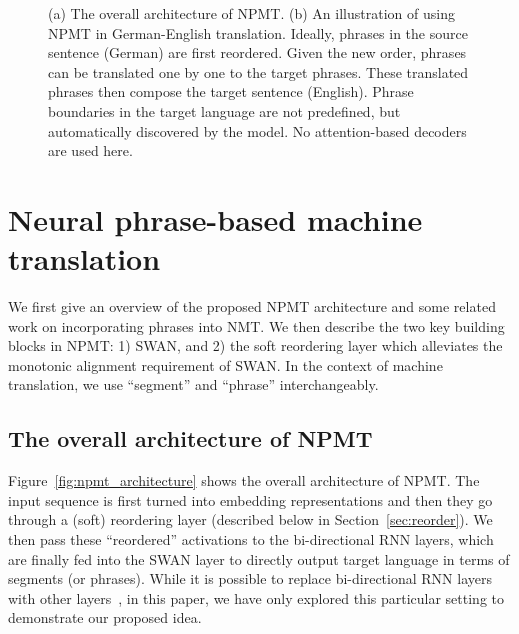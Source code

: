 \documentclass{article}
\begin{document}
\begin{figure} \centering
  \caption{\small{(a) The overall architecture of NPMT. (b) An illustration of using
  NPMT in German-English translation. Ideally, phrases in the source sentence
  (German) are first reordered. Given the new order, phrases can be translated
  one by one to the target phrases. These translated phrases then compose the
  target sentence (English). Phrase boundaries in the target language are not
  predefined, but automatically discovered by the model. No attention-based
  decoders are used here.}}
	\label{fig:npmt}
\end{figure}




\section{Neural phrase-based machine translation}
\label{sec:model}

We first give an overview of the proposed NPMT architecture and some related
work on incorporating phrases into NMT. We then describe the two key building
blocks in NPMT: 1) SWAN, and 2) the soft reordering layer which alleviates the
monotonic alignment requirement of SWAN. In the context of machine translation,
we use ``segment'' and ``phrase'' interchangeably.

\subsection{The overall architecture of NPMT}
Figure~\ref{fig:npmt_architecture} shows the overall architecture of NPMT. The
input sequence is first turned into embedding representations and then they go
through a (soft) reordering layer (described below in
Section~\ref{sec:reorder}). We then pass these ``reordered'' activations to the
bi-directional RNN layers, which are finally fed into the SWAN layer to directly
output target language in terms of segments (or phrases). While it is possible
to replace bi-directional RNN layers with other
layers~\citep{gehring2017convolutional}, in this paper, we have only explored
this particular setting to demonstrate our proposed idea.
\end{document}
